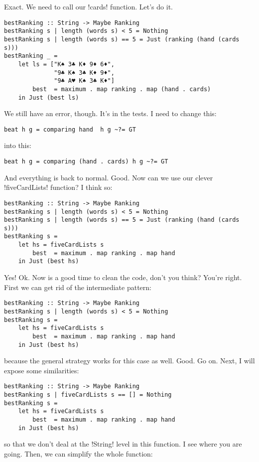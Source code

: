 \lhN Exact. We need to call our \il!cards! function.
\lhA \error Let's do it.
\begin{lstlisting}[frame=single]
bestRanking :: String -> Maybe Ranking
bestRanking s | length (words s) < 5 = Nothing
bestRanking s | length (words s) == 5 = Just (ranking (hand (cards s)))
bestRanking _ = 
    let ls = ["K♠ 3♣ K♦ 9♦ 6♦", 
              "9♣ K♠ 3♣ K♦ 9♦", 
              "9♣ A♥ K♠ 3♣ K♦"]
        best  = maximum . map ranking . map (hand . cards) 
    in Just (best ls)
\end{lstlisting}
\error We still have an error, though.
\lhN It's in the tests. I need to change this:
\begin{lstlisting}[frame=single]
beat h g = comparing hand  h g ~?= GT
\end{lstlisting}
into this:
\begin{lstlisting}[frame=single]
beat h g = comparing (hand . cards) h g ~?= GT
\end{lstlisting}
\success And everything is back to normal.
\lhA Good.
\lhN Now can we use our clever \il!fiveCardLists! function?
\lhA I think so:
\begin{lstlisting}[frame=single]
bestRanking :: String -> Maybe Ranking
bestRanking s | length (words s) < 5 = Nothing
bestRanking s | length (words s) == 5 = Just (ranking (hand (cards s)))
bestRanking s = 
    let hs = fiveCardLists s
        best  = maximum . map ranking . map hand 
    in Just (best hs)
\end{lstlisting}
\success Yes!
\lhN Ok. Now is a good time to clean the code, don't you think?
\lhA You're right. First we can get rid of the intermediate pattern:
\begin{lstlisting}[frame=single]
bestRanking :: String -> Maybe Ranking
bestRanking s | length (words s) < 5 = Nothing
bestRanking s = 
    let hs = fiveCardLists s
        best  = maximum . map ranking . map hand 
    in Just (best hs)
\end{lstlisting}
\success because the general strategy works for this case as well.
\lhN Good. Go on.
\lhA Next, I will expose some similarities:
\begin{lstlisting}[frame=single]
bestRanking :: String -> Maybe Ranking
bestRanking s | fiveCardLists s == [] = Nothing
bestRanking s = 
    let hs = fiveCardLists s
        best  = maximum . map ranking . map hand 
    in Just (best hs)
\end{lstlisting}
\success so that we don't deal at the \il!String! level in this function.
\lhN I see where you are going. 
\lhA Then, we can simplify the whole function:
